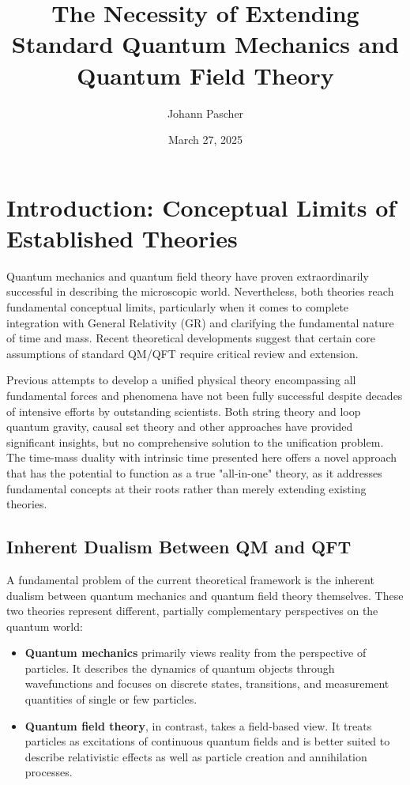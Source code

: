 \documentclass[12pt,a4paper]{article}  %
\title{The Necessity of Extending Standard Quantum Mechanics and Quantum Field Theory}
\author{Johann Pascher}
\date{March 27, 2025}
\begin{document}
	
	\maketitle
	
	\tableofcontents
	\newpage
	
	\section{Introduction: Conceptual Limits of Established Theories}
	
	Quantum mechanics and quantum field theory have proven extraordinarily successful in describing the microscopic world. Nevertheless, both theories reach fundamental conceptual limits, particularly when it comes to complete integration with General Relativity (GR) and clarifying the fundamental nature of time and mass. Recent theoretical developments suggest that certain core assumptions of standard QM/QFT require critical review and extension.
	
	Previous attempts to develop a unified physical theory encompassing all fundamental forces and phenomena have not been fully successful despite decades of intensive efforts by outstanding scientists. Both string theory and loop quantum gravity, causal set theory and other approaches have provided significant insights, but no comprehensive solution to the unification problem. The time-mass duality with intrinsic time presented here offers a novel approach that has the potential to function as a true "all-in-one" theory, as it addresses fundamental concepts at their roots rather than merely extending existing theories.
	
	\subsection{Inherent Dualism Between QM and QFT}
	
	A fundamental problem of the current theoretical framework is the inherent dualism between quantum mechanics and quantum field theory themselves. These two theories represent different, partially complementary perspectives on the quantum world:
	
	\begin{itemize}
		\item \textbf{Quantum mechanics} primarily views reality from the perspective of particles. It describes the dynamics of quantum objects through wavefunctions and focuses on discrete states, transitions, and measurement quantities of single or few particles.
		
		\item \textbf{Quantum field theory}, in contrast, takes a field-based view. It treats particles as excitations of continuous quantum fields and is better suited to describe relativistic effects as well as particle creation and annihilation processes.
	\end{itemize}
	
\end{document}
